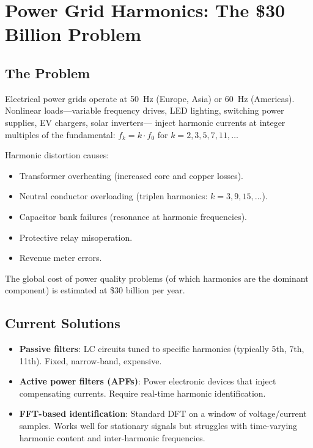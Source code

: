 \documentclass[11pt,a4paper]{article}
\begin{document}
\section{Power Grid Harmonics: The \$30 Billion Problem}
\label{sec:harmonics}

\subsection{The Problem}

Electrical power grids operate at 50~Hz (Europe, Asia) or 60~Hz
(Americas). Nonlinear loads---variable frequency drives, LED
lighting, switching power supplies, EV chargers, solar inverters---
inject harmonic currents at integer multiples of the fundamental:
$f_k = k \cdot f_0$ for $k = 2, 3, 5, 7, 11, \ldots$

Harmonic distortion causes:
\begin{itemize}
  \item Transformer overheating (increased core and copper losses).
  \item Neutral conductor overloading (triplen harmonics: $k = 3, 9,
    15, \ldots$).
  \item Capacitor bank failures (resonance at harmonic frequencies).
  \item Protective relay misoperation.
  \item Revenue meter errors.
\end{itemize}

The global cost of power quality problems (of which harmonics are
the dominant component) is estimated at \$30 billion per year.

\subsection{Current Solutions}

\begin{itemize}
  \item \textbf{Passive filters}: LC circuits tuned to specific
    harmonics (typically 5th, 7th, 11th). Fixed, narrow-band,
    expensive.
  \item \textbf{Active power filters (APFs)}: Power electronic
    devices that inject compensating currents. Require real-time
    harmonic identification.
  \item \textbf{FFT-based identification}: Standard DFT on a
    window of voltage/current samples. Works well for stationary
    signals but struggles with time-varying harmonic content and
    inter-harmonic frequencies.
\end{itemize}
\end{document}
